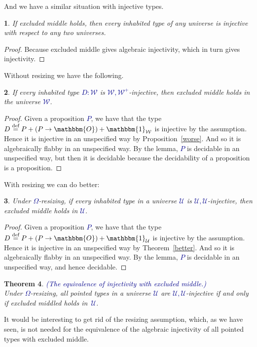 \documentclass[10pt]{article}
\newcommand{\db}{\textcolor{darkblue}}
\newcommand{\df}[1]{\emph{\db{#1}}}
\newcommand{\m}[1]{\db{$#1$}}
\newcommand{\U}{\mathcal{U}}
\newcommand{\W}{\mathcal{W}}
\newcommand{\Zero}{\mathbbm{O}}
\newcommand{\One}{\mathbbm{1}}
\newcommand{\eqdef}{\overset{\text{def}}{=}}
\newtheorem{numbered}{}
\newtheorem{theorem}[numbered]{Theorem}
\theoremstyle{definition}
\begin{document}
\noindent
And we have a similar situation with injective types.
\begin{numbered}
  If excluded middle holds, then every inhabited type of any universe is
  injective with respect to any two universes.
\end{numbered}
\begin{proof}
  Because excluded middle gives algebraic injectivity, which in turn gives
  injectivity.
\end{proof}
\noindent Without resizing we have the following.
\begin{numbered}
  If every inhabited type \m{D:\W} is \m{\W,\W^+}-injective, then
  excluded middle holds in the universe \m{\W}.
\end{numbered}
\begin{proof}
  Given a proposition \m{P}, we have that the type \m{D \eqdef P + (P
    \to \Zero) + \One_{\W}} is injective by the assumption. Hence it
  is injective in an unspecified way by Proposition~\ref{worse}. And
  so it is algebraically flabby in an unspecified way.  By the lemma,
  \m{P} is decidable in an unspecified way, but then it is decidable
  because the decidability of a proposition is a proposition.
\end{proof}
\noindent With resizing we can do better:
\begin{numbered}
  Under \m{\Omega}-resizing, if every inhabited type in a universe \m{\U} is
  \m{\U,\U}-injective, then excluded middle holds in \m{\U}.
\end{numbered}
\begin{proof}
  Given a proposition \m{P}, we have that the type \m{D \eqdef P + (P
    \to \Zero) + \One_{\U}} is injective by the assumption. Hence it
  is injective in an unspecified way by
  Theorem~\ref{better}. And so it is algebraically flabby in an
  unspecified way.  By the lemma, \m{P} is decidable in an unspecified
  way, and hence decidable.
\end{proof}
\begin{theorem} \df{(The equivalence of injectivity with excluded middle.)} \\
  Under \m{\Omega}-resizing, all pointed types in a universe \m{\U} are
  \m{\U,\U}-injective if and only if excluded middled
  holds in~\m{\U}.
\end{theorem}
It would be interesting to get rid of the resizing assumption, which,
as we have seen, is not needed for the equivalence of the algebraic
injectivity of all pointed types with excluded middle.



\end{document}
